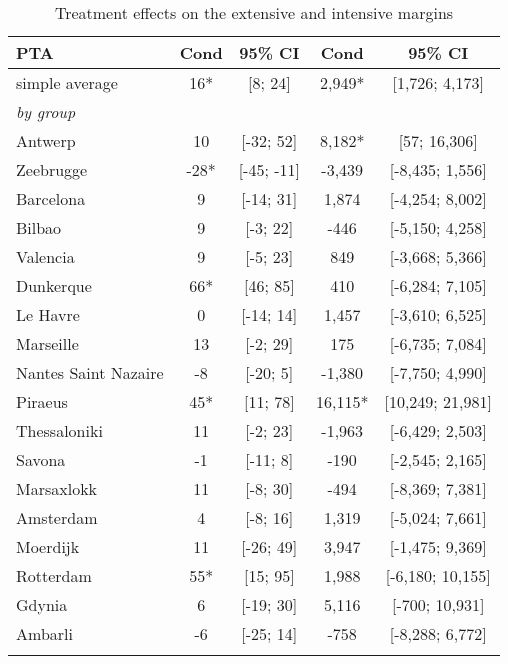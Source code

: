 \begin{table}[ht]
\centering
\caption{Treatment effects on the extensive and intensive margins} 
\begingroup\begin{adjustbox}{max width=\textwidth}
\begin{tabular}{lcccc}
  \hline
\hline
PTA & Cond & 95\% CI & Cond & 95\% CI \\ 
  \hline
simple average &  16* & [8; 24] &  2,949* & [1,726; 4,173] \\ 
   [1ex]\emph{by group} &  &  &  &  \\ 
   \hline
Antwerp &  10 & [-32; 52] &  8,182* & [57; 16,306] \\ 
  Zeebrugge & -28* & [-45; -11] & -3,439 & [-8,435; 1,556] \\ 
  Barcelona &   9 & [-14; 31] &  1,874 & [-4,254; 8,002] \\ 
  Bilbao &   9 & [-3; 22] &   -446 & [-5,150; 4,258] \\ 
  Valencia &   9 & [-5; 23] &    849 & [-3,668; 5,366] \\ 
  Dunkerque &  66* & [46; 85] &    410 & [-6,284; 7,105] \\ 
  Le Havre &   0 & [-14; 14] &  1,457 & [-3,610; 6,525] \\ 
  Marseille &  13 & [-2; 29] &    175 & [-6,735; 7,084] \\ 
  Nantes Saint Nazaire &  -8 & [-20; 5] & -1,380 & [-7,750; 4,990] \\ 
  Piraeus &  45* & [11; 78] & 16,115* & [10,249; 21,981] \\ 
  Thessaloniki &  11 & [-2; 23] & -1,963 & [-6,429; 2,503] \\ 
  Savona &  -1 & [-11; 8] &   -190 & [-2,545; 2,165] \\ 
  Marsaxlokk &  11 & [-8; 30] &   -494 & [-8,369; 7,381] \\ 
  Amsterdam &   4 & [-8; 16] &  1,319 & [-5,024; 7,661] \\ 
  Moerdijk &  11 & [-26; 49] &  3,947 & [-1,475; 9,369] \\ 
  Rotterdam &  55* & [15; 95] &  1,988 & [-6,180; 10,155] \\ 
  Gdynia &   6 & [-19; 30] &  5,116 & [-700; 10,931] \\ 
  Ambarli &  -6 & [-25; 14] &   -758 & [-8,288; 6,772] \\ 
   [2ex] \hline \hline {}\end{tabular} 
 \end{adjustbox} \label{tab:marginal_results}
\endgroup
\end{table}
